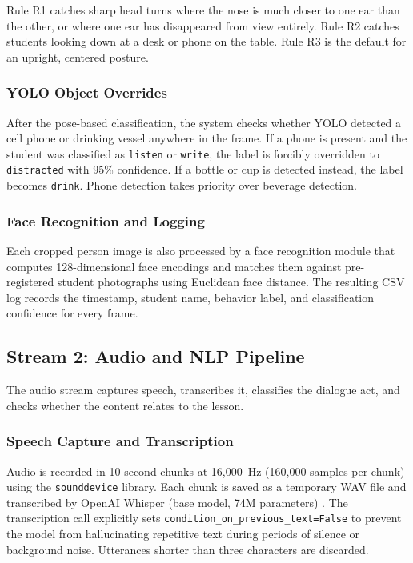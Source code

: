 \documentclass[conference]{IEEEtran}
\begin{document}
Rule R1 catches sharp head turns where the nose is much closer to one ear than the other, or where one ear has disappeared from view entirely. Rule R2 catches students looking down at a desk or phone on the table. Rule R3 is the default for an upright, centered posture.

\subsubsection{YOLO Object Overrides}
After the pose-based classification, the system checks whether YOLO detected a cell phone or drinking vessel anywhere in the frame. If a phone is present and the student was classified as \texttt{listen} or \texttt{write}, the label is forcibly overridden to \texttt{distracted} with 95\% confidence. If a bottle or cup is detected instead, the label becomes \texttt{drink}. Phone detection takes priority over beverage detection.

\subsubsection{Face Recognition and Logging}
Each cropped person image is also processed by a face recognition module that computes 128-dimensional face encodings and matches them against pre-registered student photographs using Euclidean face distance. The resulting CSV log records the timestamp, student name, behavior label, and classification confidence for every frame.

\subsection{Stream 2: Audio and NLP Pipeline}

The audio stream captures speech, transcribes it, classifies the dialogue act, and checks whether the content relates to the lesson.

\subsubsection{Speech Capture and Transcription}
Audio is recorded in 10-second chunks at 16,000~Hz (160,000 samples per chunk) using the \texttt{sounddevice} library. Each chunk is saved as a temporary WAV file and transcribed by OpenAI Whisper (base model, 74M parameters) \cite{b5}. The transcription call explicitly sets \texttt{condition\_on\_previous\_text=False} to prevent the model from hallucinating repetitive text during periods of silence or background noise. Utterances shorter than three characters are discarded.
\end{document}
